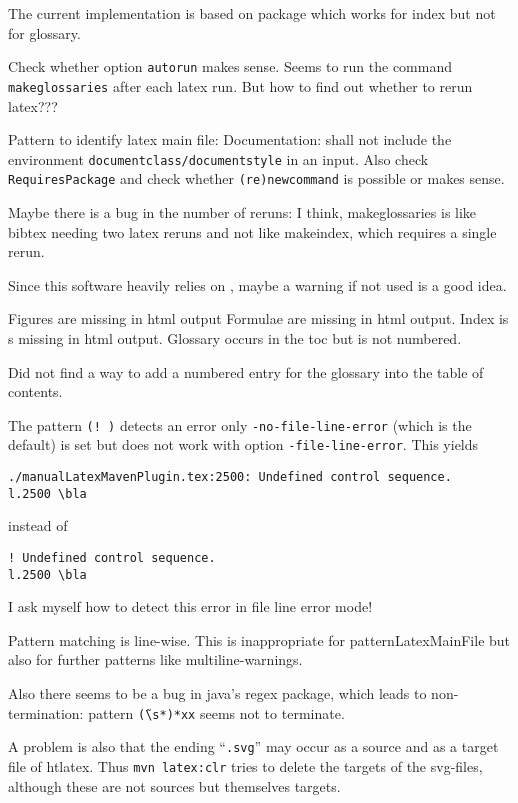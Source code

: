 \documentclass[12pt]{book}
\begin{document}
The current implementation is based on package  
which works for index but not for glossary. 

Check whether  option \texttt{autorun} makes sense. 
Seems to run the command \texttt{makeglossaries} after each latex run. 
But how to find out whether to rerun latex??? 

Pattern to identify latex main file: 
Documentation: shall not include the environment 
\texttt{documentclass/documentstyle} in an input. 
Also check \texttt{RequiresPackage} 
and check whether \texttt{(re)newcommand} is possible %
or makes sense. 

Maybe there is a bug in the number of reruns: 
I think, makeglossaries is like bibtex needing two latex reruns 
and not like makeindex, which requires a single rerun. 

Since this software heavily relies on , 
maybe a warning if not used is a good idea. 

Figures are missing in html output 
Formulae are missing in html output. 
Index is s missing in html output. 
Glossary occurs in the toc but is not numbered. 

Did not find a way to add a numbered entry for the glossary 
into the table of contents. 

The pattern \texttt{(!\ )} detects an error only %
\texttt{-no-file-line-error} (which is the default) is set 
but does not work with option \texttt{-file-line-error}. 
This yields 
%
\begin{verbatim}
./manualLatexMavenPlugin.tex:2500: Undefined control sequence.
l.2500 \bla
\end{verbatim}
%
instead of 
%
\begin{verbatim}
! Undefined control sequence.
l.2500 \bla
\end{verbatim}

I ask myself how to detect this error in file line error mode! 


Pattern matching is line-wise. 
This is inappropriate for patternLatexMainFile 
but also for further patterns like multiline-warnings. 

Also there seems to be a bug in java's regex package, 
which leads to non-termination: 
pattern \texttt{\~(\textbackslash s*)*xx} seems not to terminate. %

A problem is also that the ending ``\texttt{.svg}'' may occur as a source 
and as a target file of htlatex. 
Thus \texttt{mvn latex:clr} tries to delete the targets of the svg-files, 
although these are not sources but themselves targets. 
\end{document}
